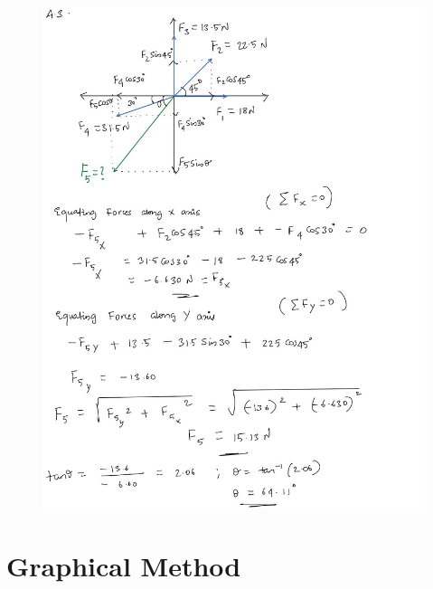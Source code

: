 \documentclass[11pt]{article}
\begin{document}
\begin{figure}[H]
	\includegraphics[scale=0.38]{a3.jpg}
	\label{fig: Polygon Law}
\end{figure}

\pagebreak

\section{Graphical Method}
\end{document}
